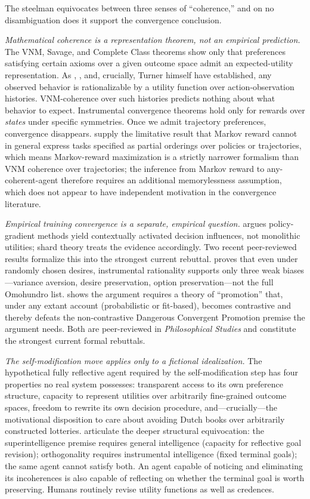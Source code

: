 \documentclass[11pt,a4paper,twocolumn]{article}
\begin{document}
The steelman equivocates between three senses of ``coherence,'' and on
no disambiguation does it support the convergence conclusion.

\emph{Mathematical coherence is a representation theorem, not an
empirical prediction.} The VNM, Savage, and Complete Class theorems
show only that preferences satisfying certain axioms over a given
outcome space admit an expected-utility representation. As
\citet{ngo2019}, \citet{shah2018}, and, crucially, Turner himself
\citep{turner2022coherent} have established, any observed behavior is
rationalizable by a utility function over action-observation histories.
VNM-coherence over such histories predicts nothing about what behavior
to expect. Instrumental convergence theorems hold only for rewards over
\emph{states} under specific symmetries. Once we admit trajectory
preferences, convergence disappears. \citet{abel2021} supply the
limitative result that Markov reward cannot in general express tasks
specified as partial orderings over policies or trajectories, which
means Markov-reward maximization is a strictly narrower formalism than
VNM coherence over trajectories; the inference from Markov reward to
any-coherent-agent therefore requires an additional memorylessness
assumption, which does not appear to have independent motivation in
the convergence literature.

\emph{Empirical training convergence is a separate, empirical question.}
\citet{turner2022reward} argues policy-gradient methods yield
contextually activated decision influences, not monolithic utilities;
shard theory treats the evidence accordingly. Two recent peer-reviewed
results formalize this into the strongest current rebuttal.
\citet{gallow2024} proves that even under randomly chosen desires,
instrumental rationality supports only three weak biases---variance
aversion, desire preservation, option preservation---not the full
Omohundro list. \citet{sharadin2025} shows the argument requires a
theory of ``promotion'' that, under any extant account (probabilistic
or fit-based), becomes contrastive and thereby defeats the
non-contrastive Dangerous Convergent Promotion premise the argument
needs. Both are peer-reviewed in \emph{Philosophical Studies} and
constitute the strongest current formal rebuttals.

\emph{The self-modification move applies only to a fictional idealization.}
The hypothetical fully reflective agent required by the self-modification
step has four properties no real system possesses: transparent access to
its own preference structure, capacity to represent utilities over
arbitrarily fine-grained outcome spaces, freedom to rewrite its own
decision procedure, and---crucially---the motivational disposition to
care about avoiding Dutch books over arbitrarily constructed lotteries.
\citet{muller2022} articulate the deeper structural equivocation: the
superintelligence premise requires general intelligence (capacity for
reflective goal revision); orthogonality requires instrumental
intelligence (fixed terminal goals); the same agent cannot satisfy both.
An agent capable of noticing and eliminating its incoherences is also
capable of reflecting on whether the terminal goal is worth preserving.
Humans routinely revise utility functions as well as credences.
\end{document}
